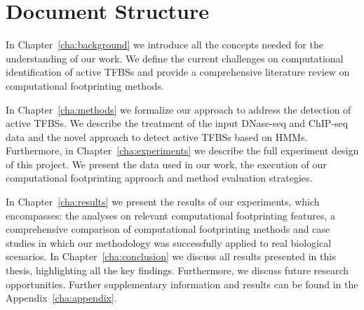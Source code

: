 \section{Document Structure}
\label{sec:document.structure}

In Chapter~\ref{cha:background} we introduce all the concepts needed for the understanding of our work. We define the current challenges on computational identification of active TFBSs and provide a comprehensive literature review on computational footprinting methods.

In Chapter~\ref{cha:methods} we formalize our approach to address the detection of active TFBSs. We describe the treatment of the input DNase-seq and ChIP-seq data and the novel approach to detect active TFBSs based on HMMs. Furthermore, in Chapter~\ref{cha:experiments} we describe the full experiment design of this project. We present the data used in our work, the execution of our computational footprinting approach and method evaluation strategies.

In Chapter~\ref{cha:results} we present the results of our experiments, which encompasses: the analyses on relevant computational footprinting features, a comprehensive comparison of computational footprinting methods and case studies in which our methodology was successfully applied to real biological scenarios. In Chapter~\ref{cha:conclusion} we discuss all results presented in this thesis, highlighting all the key findings. Furthermore, we discuss future research opportunities. Further supplementary information and results can be found in the Appendix~\ref{cha:appendix}.


